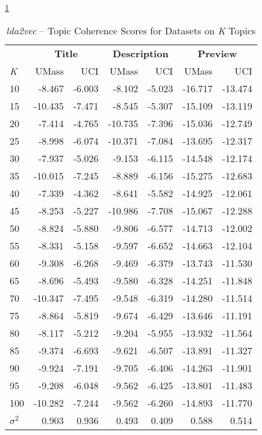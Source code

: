 \documentclass[letterpaper,12pt]{article}
\begin{document}
\ref{tab:lda2vec_data_comp}
\begin{table}
	\caption{\label{tab:lda2vec_data_comp} \emph{lda2vec} -- Topic Coherence Scores for Datasets on \emph{K} Topics}
	\begin{center}
		\begin{tabular}{| l | rr | rr | rr |}
			\hline
			{} & \multicolumn{2}{c|}{\textbf{Title}} & \multicolumn{2}{c|}{\textbf{Description}} & \multicolumn{2}{c|}{\textbf{Preview}} \\
			\emph{K} &       UMass &    UCI &  UMass &    UCI &   UMass &    UCI \\
			\hline
			10  &  -8.467 & -6.003 &      -8.102 & -5.023 & -16.717 & -13.474 \\
			15  & -10.435 & -7.471 &      -8.545 & -5.307 & -15.109 & -13.119 \\
			20  &  -7.414 & -4.765 &     -10.735 & -7.396 & -15.036 & -12.749 \\
			25  &  -8.998 & -6.074 &     -10.371 & -7.084 & -13.695 & -12.317 \\
			30  &  -7.937 & -5.026 &      -9.153 & -6.115 & -14.548 & -12.174 \\
			35  & -10.015 & -7.245 &      -8.889 & -6.156 & -15.275 & -12.683 \\
			40  &  -7.339 & -4.362 &      -8.641 & -5.582 & -14.925 & -12.061 \\
			45  &  -8.253 & -5.227 &     -10.986 & -7.708 & -15.067 & -12.288 \\
			50  &  -8.824 & -5.880 &      -9.806 & -6.577 & -14.713 & -12.002 \\
			55  &  -8.331 & -5.158 &      -9.597 & -6.652 & -14.663 & -12.104 \\
			60  &  -9.308 & -6.268 &      -9.469 & -6.379 & -13.743 & -11.530 \\
			65  &  -8.696 & -5.493 &      -9.580 & -6.328 & -14.251 & -11.848 \\
			70  & -10.347 & -7.495 &      -9.548 & -6.319 & -14.280 & -11.514 \\
			75  &  -8.864 & -5.819 &      -9.674 & -6.429 & -13.646 & -11.191 \\
			80  &  -8.117 & -5.212 &      -9.204 & -5.955 & -13.932 & -11.564 \\
			85  &  -9.374 & -6.693 &      -9.621 & -6.507 & -13.891 & -11.327 \\
			90  &  -9.924 & -7.191 &      -9.705 & -6.406 & -14.263 & -11.901 \\
			95  &  -9.208 & -6.048 &      -9.562 & -6.425 & -13.801 & -11.483 \\
			100 & -10.282 & -7.244 &      -9.562 & -6.260 & -14.893 & -11.770 \\
			\hline
			$\sigma^2$ & 0.903 & 0.936 & 0.493 & 0.409 & 0.588 & 0.514 \\
			\hline
			\end{tabular}
	\end{center}
\end{table}
\end{document}
